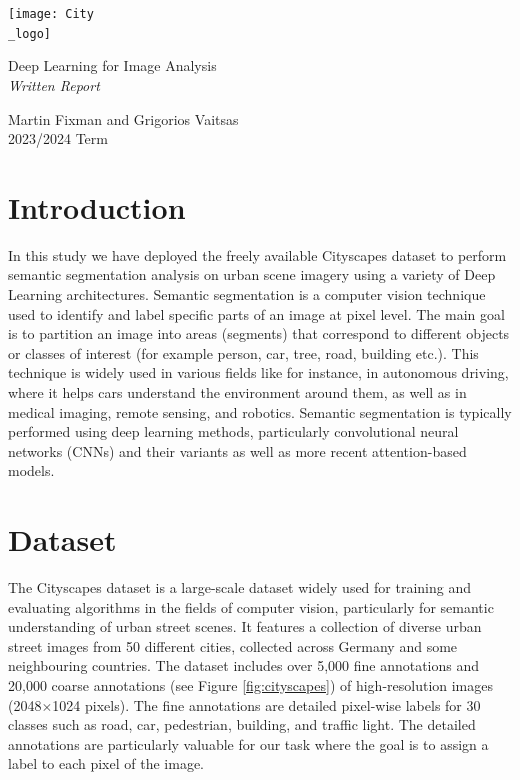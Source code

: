\documentclass[a4paper,11pt]{article}
\begin{document}
\begin{titlepage}
	\centering
	\texttt{[image: City\\\_logo]} \\[4em]
	\begin{bfseries}
		\begin{Huge}
			Deep Learning for Image Analysis \\[35pt]
			\textsl{Written Report}
		\end{Huge}
	\end{bfseries}
	\vfill{}
	\begin{LARGE}
		\begin{sffamily}
			Martin Fixman and Grigorios Vaitsas \\[10pt]
			2023/2024 Term
		\end{sffamily}
	\end{LARGE}
\end{titlepage}

\section{Introduction}
In this study we have deployed the freely available Cityscapes dataset \cite{DBLP:journals/corr/CordtsORREBFRS16} to perform semantic segmentation analysis on urban scene imagery using a variety of Deep Learning architectures. Semantic segmentation is a computer vision technique used to identify and label specific parts of an image at pixel level. The main goal is to partition an image into areas (segments) that correspond to different objects or classes of interest (for example person, car, tree, road, building etc.). This technique is widely used in various fields like for instance, in autonomous driving, where it helps cars understand the  environment around them, as well as in medical imaging, remote sensing, and robotics. Semantic segmentation is typically performed using deep learning methods, particularly convolutional neural networks (CNNs) and their variants as well as more recent attention-based models. 
\section{Dataset}
The Cityscapes dataset is a large-scale dataset widely used for training and evaluating algorithms in the fields of computer vision, particularly for semantic understanding of urban street scenes. It features a collection of diverse urban street images from 50 different cities, collected across Germany and some neighbouring countries. The dataset includes over 5,000 fine annotations and 20,000 coarse annotations (see Figure \ref{fig:cityscapes}) of high-resolution images (2048$\times$1024 pixels). The fine annotations are detailed pixel-wise labels for 30 classes such as road, car, pedestrian, building, and traffic light. The detailed annotations are particularly valuable for our task where the goal is to assign a label to each pixel of the image. 
\end{document}
